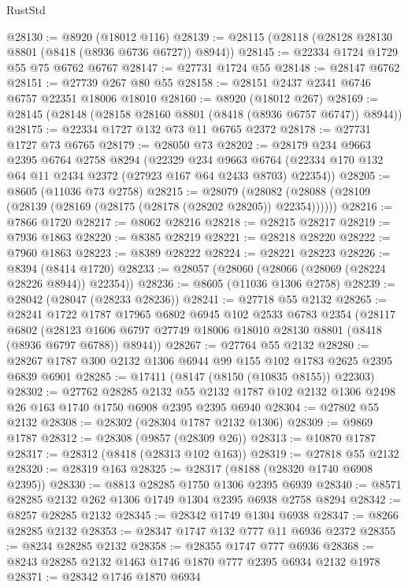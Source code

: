 \begin{lexlean}{RustStd}
\begin{coremodule}
@28130 := @8920 (@18012 @116)
@28139 := @28115 (@28118 (@28128 @28130 @8801 (@8418 (@8936 @6736 @6727)) @8944))
@28145 := @22334 @1724 @1729 @55 @75 @6762 @6767
@28147 := @27731 @1724 @55
@28148 := @28147 @6762
@28151 := @27739 @267 @80 @55
@28158 := @28151 @2437 @2341 @6746 @6757 @22351 @18006 @18010
@28160 := @8920 (@18012 @267)
@28169 := @28145 (@28148 (@28158 @28160 @8801 (@8418 (@8936 @6757 @6747)) @8944))
@28175 := @22334 @1727 @132 @73 @11 @6765 @2372
@28178 := @27731 @1727 @73 @6765
@28179 := @28050 @73
@28202 := @28179
    @234
    @9663
    @2395
    @6764
    @2758
    @8294
    (@22329
      @234
      @9663
      @6764
      (@22334 @170 @132 @64 @11 @2434 @2372 (@27923 @167 @64 @2433 @8703) @22354))
@28205 := @8605 (@11036 @73 @2758)
@28215 := @28079
    (@28082 (@28088 (@28109 (@28139 (@28169 (@28175 (@28178 (@28202 @28205)) @22354))))))
@28216 := @7866 @1720
@28217 := @8062 @28216
@28218 := @28215 @28217
@28219 := @7936 @1863
@28220 := @8385 @28219
@28221 := @28218 @28220
@28222 := @7960 @1863
@28223 := @8389 @28222
@28224 := @28221 @28223
@28226 := @8394 (@8414 @1720)
@28233 := @28057 (@28060 (@28066 (@28069 (@28224 @28226 @8944)) @22354))
@28236 := @8605 (@11036 @1306 @2758)
@28239 := @28042 (@28047 (@28233 @28236))
@28241 := @27718 @55 @2132
@28265 := @28241
    @1722
    @1787
    @17965
    @6802
    @6945
    @102
    @2533
    @6783
    @2354
    (@28117
      @6802
      (@28123 @1606 @6797 @27749 @18006 @18010 @28130 @8801 (@8418 (@8936 @6797 @6788)) @8944))
@28267 := @27764 @55 @2132
@28280 := @28267 @1787 @300 @2132 @1306 @6944 @99 @155 @102 @1783 @2625 @2395 @6839 @6901
@28285 := @17411 (@8147 (@8150 (@10835 @8155)) @22303)
@28302 := @27762
    @28285
    @2132
    @55
    @2132
    @1787
    @102
    @2132
    @1306
    @2498
    @26
    @163
    @1740
    @1750
    @6908
    @2395
    @2395
    @6940
@28304 := @27802 @55 @2132
@28308 := @28302 (@28304 @1787 @2132 @1306)
@28309 := @9869 @1787
@28312 := @28308 (@9857 (@28309 @26))
@28313 := @10870 @1787
@28317 := @28312 (@8418 (@28313 @102 @163))
@28319 := @27818 @55 @2132
@28320 := @28319 @163
@28325 := @28317 (@8188 (@28320 @1740 @6908 @2395))
@28330 := @8813 @28285 @1750 @1306 @2395 @6939
@28340 := @8571 @28285 @2132 @262 @1306 @1749 @1304 @2395 @6938 @2758 @8294
@28342 := @8257 @28285 @2132
@28345 := @28342 @1749 @1304 @6938
@28347 := @8266 @28285 @2132
@28353 := @28347 @1747 @132 @777 @11 @6936 @2372
@28355 := @8234 @28285 @2132
@28358 := @28355 @1747 @777 @6936
@28368 := @8243 @28285 @2132 @1463 @1746 @1870 @777 @2395 @6934 @2132 @1978
@28371 := @28342 @1746 @1870 @6934

\end{coremodule}
\end{lexlean}
